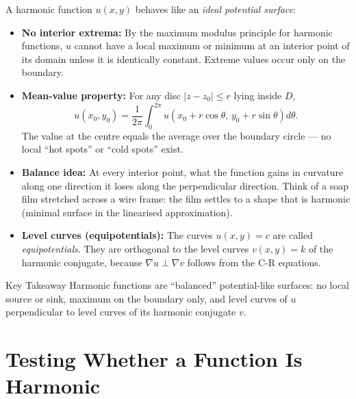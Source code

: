 \documentclass[12pt,a4paper]{article}
\begin{document}
A harmonic function $u(x,y)$ behaves like an \emph{ideal potential surface}:

\begin{itemize}
  \item \textbf{No interior extrema:} By the maximum modulus principle for harmonic functions,
  $u$ cannot have a local maximum or minimum at an interior point of its domain unless it is
  identically constant. Extreme values occur only on the boundary.
  \item \textbf{Mean-value property:} For any disc $|z-z_{0}| \leq r$ lying inside $D$,
  \[
    u(x_{0},y_{0}) = \frac{1}{2\pi}\int_{0}^{2\pi} u\!\left(x_{0}+r\cos\theta,\,
    y_{0}+r\sin\theta\right)d\theta.
  \]
  The value at the centre equals the average over the boundary circle --- no local ``hot spots''
  or ``cold spots'' exist.
  \item \textbf{Balance idea:} At every interior point, what the function gains in curvature
  along one direction it loses along the perpendicular direction. Think of a soap film stretched
  across a wire frame: the film settles to a shape that is harmonic (minimal surface in the
  linearised approximation).
  \item \textbf{Level curves (equipotentials):} The curves $u(x,y)=c$ are called
  \emph{equipotentials}. They are orthogonal to the level curves $v(x,y)=k$ of the harmonic
  conjugate, because $\nabla u \perp \nabla v$ follows from the C-R equations.
\end{itemize}

\begin{learnbox}{Key Takeaway}
Harmonic functions are ``balanced'' potential-like surfaces: no local source or sink, maximum
on the boundary only, and level curves of $u$ perpendicular to level curves of its harmonic
conjugate $v$.
\end{learnbox}

\section{Testing Whether a Function Is Harmonic}
\end{document}
